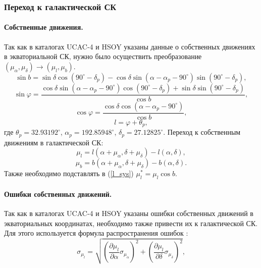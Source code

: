 \documentclass{matmex-diploma-custom}
\begin{document}
\pagebreak
\subsubsection{Переход к галактической СК}
\par \paragraph{Собственные движения.} 
Так как в каталогах UCAC-4 и HSOY указаны данные о собственных движениях в экваториальной СК, нужно было осуществить преобразование $(\mu_{\alpha}, \mu_{\delta}) \rightarrow (\mu_l, \mu_b)$.
\begin{equation}
        \sin{b} = \sin{\delta} \cos(90^{\circ} - \delta_p) - \cos{\delta} \sin(\alpha - \alpha_p - 90^{\circ}) \sin(90^{\circ} - \delta_p),
\end{equation}
\begin{equation}
        \sin{\varphi} = \frac{\cos{\delta} \sin(\alpha - \alpha_p - 90^{\circ}) \cos(90^{\circ} - \delta_p) + \sin{\delta} \sin(90^{\circ} - \delta_p)}{\cos{b}},
\end{equation}
\begin{equation}
        \cos{\varphi} = \frac{ \cos{\delta} \cos(\alpha - \alpha_p - 90^{\circ})}{\cos{b}},
\end{equation}
\begin{equation}
        l = \varphi + \theta_p,
\end{equation}
где $\theta_p = 32.93192^{\circ}$, $\alpha_p = 192.85948^{\circ}$, $\delta_p = 27.12825^{\circ}$. Переход к собственным движениям в галактической СК:
\begin{equation}
        \mu_l = l(\alpha + \mu_{\alpha}, \delta + \mu_{\delta}) - l(\alpha, \delta),
\end{equation}
\begin{equation}
        \mu_b = b(\alpha + \mu_{\alpha}, \delta + \mu_{\delta}) - b(\alpha, \delta).
\end{equation}
Также необходимо подставлять в (\ref{l_sys}) $\mu_l^* = \mu_l \cos{b}$.

\par \paragraph{Ошибки собственных движений.} 
\par Так как в каталогах UCAC-4 и HSOY указаны ошибки собственных движений в экваториальных координатах, необходимо также привести их к галактической СК. Для этого используется формула распространения ошибок \cite{6}:
\begin{equation}
        \sigma_{\mu_l} = \sqrt{\left(\frac{\partial \mu_l}{\partial \alpha} \sigma_{\mu_{\alpha}} \right)^2 + \left(\frac{\partial \mu_l}{\partial\delta} \sigma_{\mu_{\delta}} \right)^2},
\end{equation}
\end{document}
